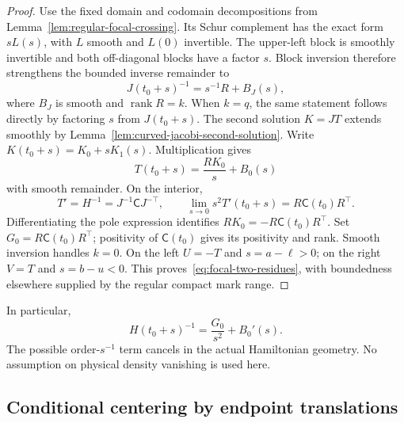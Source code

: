\documentclass[11pt,reqno]{amsart}
\theoremstyle{definition}
\theoremstyle{remark}
\numberwithin{equation}{section}
\begin{document}
\begin{proof}
Use the fixed domain and codomain decompositions from
Lemma~\ref{lem:regular-focal-crossing}. Its Schur complement has the
exact form \(sL(s)\), with \(L\) smooth and \(L(0)\) invertible.
The upper-left block is smoothly invertible and both off-diagonal
blocks have a factor \(s\). Block inversion therefore strengthens the
bounded inverse remainder to
\[
 J(t_0+s)^{-1}=s^{-1}R+B_J(s),
\]
where \(B_J\) is smooth and \(\operatorname{rank}R=k\).
When \(k=q\), the same statement follows directly by factoring \(s\)
from \(J(t_0+s)\). The second solution \(K=JT\) extends smoothly
by Lemma~\ref{lem:curved-jacobi-second-solution}. Write
\(K(t_0+s)=K_0+sK_1(s)\). Multiplication gives
\[
 T(t_0+s)=\frac{RK_0}{s}+B_0(s)
\]
with smooth remainder. On the interior,
\[
 T'=H^{-1}=J^{-1}\mathsf C J^{-\top},\qquad
 \lim_{s\to0}s^2T'(t_0+s)=R\mathsf C(t_0)R^\top.
\]
Differentiating the pole expression identifies
\(RK_0=-R\mathsf C(t_0)R^\top\). Set
\(G_0=R\mathsf C(t_0)R^\top\); positivity of \(\mathsf C(t_0)\)
gives its positivity and rank. Smooth inversion handles \(k=0\).
On the left \(U=-T\) and \(s=a-\ell>0\); on the right \(V=T\)
and \(s=b-u<0\). This proves~\eqref{eq:focal-two-residues}, with
boundedness elsewhere supplied by the regular compact mark range.
\end{proof}

In particular,
\[
 H(t_0+s)^{-1}=\frac{G_0}{s^2}+B_0'(s).
\]
The possible order-\(s^{-1}\) term cancels in the actual Hamiltonian
geometry. No assumption on physical density vanishing is used here.
\subsection{Conditional centering by endpoint translations}
\end{document}
